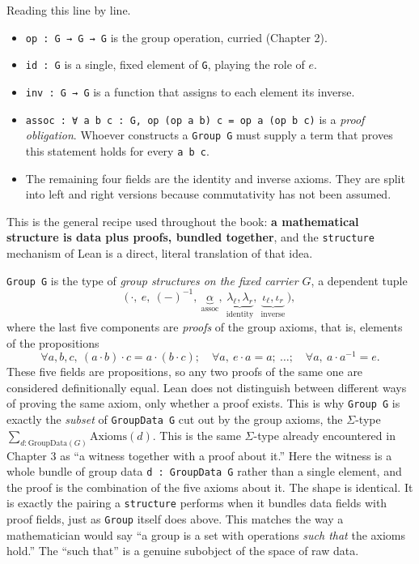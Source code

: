 Reading this line by line.

\begin{itemize}
\tightlist
\item
  \texttt{op : G → G → G} is the group operation, curried (Chapter 2).
\item
  \texttt{id : G} is a single, fixed element of \texttt{G}, playing the role of \(e\).
\item
  \texttt{inv : G → G} is a function that assigns to each element its inverse.
\item
  \texttt{assoc : ∀ a b c : G, op (op a b) c = op a (op b c)} is a \emph{proof obligation}. Whoever constructs a \texttt{Group G} must supply a term that proves this statement holds for every \texttt{a b c}.
\item
  The remaining four fields are the identity and inverse axioms. They are split into left and right versions because commutativity has not been assumed.
\end{itemize}

This is the general recipe used throughout the book: \textbf{a mathematical structure is data plus proofs, bundled together}, and the \texttt{structure} mechanism of Lean is a direct, literal translation of that idea.

\begin{mathreading}

\texttt{Group G} is the type of \emph{group structures on the fixed carrier \(G\)}, a dependent tuple \[
\Big(\,\cdot,\ e,\ (-)^{-1},\ \underbrace{\alpha}_{\text{assoc}},\
\underbrace{\lambda_\ell,\lambda_r}_{\text{identity}},\
\underbrace{\iota_\ell,\iota_r}_{\text{inverse}}\,\Big),
\] where the last five components are \emph{proofs} of the group axioms, that is, elements of the propositions \[
\forall a,b,c,\ (a\cdot b)\cdot c = a\cdot(b\cdot c);\quad
\forall a,\ e\cdot a = a;\ \ldots;\quad \forall a,\ a\cdot a^{-1}=e.
\] These five fields are propositions, so any two proofs of the same one are considered definitionally equal. Lean does not distinguish between different ways of proving the same axiom, only whether a proof exists. This is why \texttt{Group G} is exactly the \emph{subset} of \texttt{GroupData G} cut out by the group axioms, the \(\Sigma\)-type \(\sum_{d : \mathrm{GroupData}(G)} \mathrm{Axioms}(d)\). This is the same \(\Sigma\)-type already encountered in Chapter 3 as ``a witness together with a proof about it.'' Here the witness is a whole bundle of group data \texttt{d : GroupData G} rather than a single element, and the proof is the combination of the five axioms about it. The shape is identical. It is exactly the pairing a \texttt{structure} performs when it bundles data fields with proof fields, just as \texttt{Group} itself does above. This matches the way a mathematician would say ``a group is a set with operations \emph{such that} the axioms hold.'' The ``such that'' is a genuine subobject of the space of raw data.

\end{mathreading}

